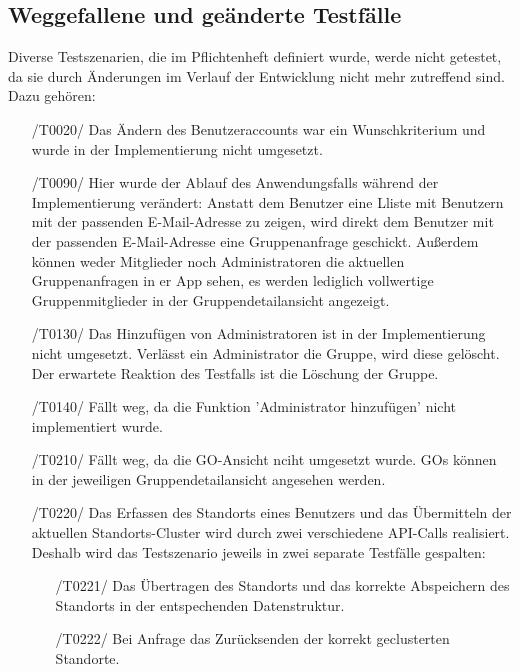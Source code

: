 \documentclass[11pt,a4paper]{scrartcl}
\begin{document}
\subsection{Weggefallene und geänderte Testfälle}\label{weggefallene Testfälle}
Diverse Testszenarien, die im Pflichtenheft definiert wurde, werde nicht getestet, da sie durch Änderungen im Verlauf der Entwicklung nicht mehr zutreffend sind. Dazu gehören:
\begin{itemize}
	\item[/T0020/] Das Ändern des Benutzeraccounts war ein Wunschkriterium und wurde in der Implementierung nicht umgesetzt.
	
	\item[/T0090/] Hier wurde der Ablauf des Anwendungsfalls während der Implementierung verändert: Anstatt dem Benutzer eine Lliste mit Benutzern mit der passenden E-Mail-Adresse zu zeigen, wird direkt dem Benutzer mit der passenden E-Mail-Adresse eine Gruppenanfrage geschickt. Außerdem können weder Mitglieder noch Administratoren die aktuellen Gruppenanfragen in er App sehen, es werden lediglich vollwertige Gruppenmitglieder in der Gruppendetailansicht angezeigt.
	
	\item[/T0130/]\label{130} Das Hinzufügen von Administratoren ist in der Implementierung nicht umgesetzt. Verlässt ein Administrator die Gruppe, wird diese gelöscht. Der erwartete Reaktion des Testfalls ist die Löschung der Gruppe.
	
	\item[/T0140/] Fällt weg, da die Funktion 'Administrator hinzufügen' nicht implementiert wurde.
	
	\item[/T0210/] Fällt weg, da die GO-Ansicht nciht umgesetzt wurde. GOs können in der jeweiligen Gruppendetailansicht angesehen werden.
	
	\item[/T0220/] Das Erfassen des Standorts eines Benutzers und das Übermitteln der aktuellen Standorts-Cluster wird durch zwei verschiedene API-Calls realisiert. Deshalb wird das Testszenario jeweils in zwei separate Testfälle gespalten:
	\begin{enumerate}
		\item[/T0221/] Das Übertragen des Standorts und das korrekte Abspeichern des Standorts in der entspechenden Datenstruktur.\label{221}
		\item[/T0222/] Bei Anfrage das Zurücksenden der korrekt geclusterten Standorte.\label{222}
	\end{enumerate}
	

\end{itemize}
\end{document}
